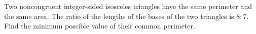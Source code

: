Two noncongruent integer-sided isosceles triangles have the same perimeter and the same area. The ratio of the lengths of the bases of the two triangles is $ 8: 7$. Find the minimum possible value of their common perimeter.